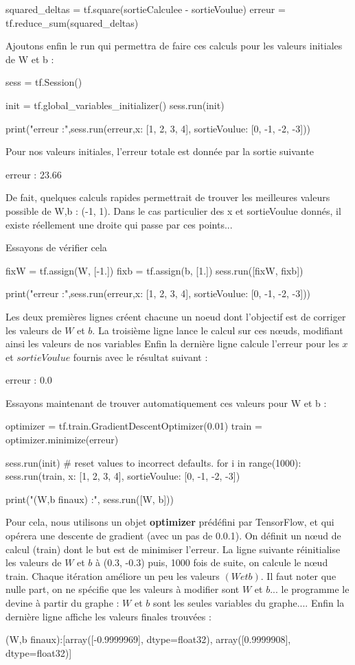 \documentclass[a4paper,11pt]{book}
\theoremstyle{theo}
\begin{document}
\begin{mypython}
squared_deltas = tf.square(sortieCalculee - sortieVoulue)
erreur = tf.reduce_sum(squared_deltas)
\end{mypython}
Ajoutons enfin le run qui permettra de faire ces calculs pour les valeurs initiales de W et b :
\begin{mypython}
sess = tf.Session()

init = tf.global_variables_initializer()
sess.run(init)

print("erreur :",sess.run(erreur,{x: [1, 2, 3, 4], sortieVoulue: [0, -1, -2, -3]}))
\end{mypython}
Pour nos valeurs initiales, l'erreur totale est donnée par la sortie suivante
\begin{myoutput}
erreur : 23.66
\end{myoutput}
De fait, quelques calculs rapides permettrait de trouver les meilleures valeurs possible de W,b : (-1, 1). Dans le cas particulier des x et sortieVoulue donnés, il existe réellement une droite qui passe par ces points...

Essayons de vérifier cela 
\begin{mypython}
fixW = tf.assign(W, [-1.])
fixb = tf.assign(b, [1.])
sess.run([fixW, fixb])

print("erreur :",sess.run(erreur,{x: [1, 2, 3, 4], sortieVoulue: [0, -1, -2, -3]}))
\end{mypython}
Les deux premières lignes créent chacune un noeud dont l'objectif est de corriger les valeurs de $W$ et $b$. La troisième ligne lance le calcul sur ces nœuds, modifiant ainsi les valeurs de nos variables
Enfin la dernière ligne calcule l'erreur pour les $x$ et $sortieVoulue$ fournis avec le résultat suivant :
\begin{myoutput}
erreur : 0.0
\end{myoutput}
Essayons maintenant de trouver automatiquement ces valeurs pour W et b :
\begin{mypython}
optimizer = tf.train.GradientDescentOptimizer(0.01)
train = optimizer.minimize(erreur)

sess.run(init) # reset values to incorrect defaults.
for i in range(1000):
  sess.run(train, {x: [1, 2, 3, 4], sortieVoulue: [0, -1, -2, -3]})

print("(W,b finaux) :", sess.run([W, b]))
\end{mypython}
Pour cela, nous utilisons un objet \textbf{optimizer} prédéfini par TensorFlow, et qui opérera une descente de gradient (avec un pas de 0.0.1). On définit un nœud de calcul (train) dont le but est de minimiser  l'erreur.
La ligne suivante réinitialise les valeurs de $W$ et $b$ à (0.3, -0.3)
puis, 1000 fois de suite, on calcule le nœud train. Chaque itération améliore un peu les valeurs $(W et b)$. Il faut noter que nulle part, on ne spécifie que les valeurs à modifier sont $W$ et $b$... le programme le devine à partir du graphe : $W$ et $b$ sont les seules variables du graphe....
Enfin la dernière ligne affiche les valeurs finales trouvées :
\begin{myoutput}
(W,b finaux):[array([-0.9999969], dtype=float32), array([0.9999908], dtype=float32)]
\end{myoutput}
\end{document}
